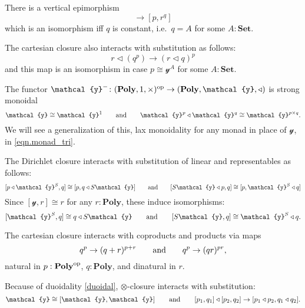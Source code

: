\documentclass[11pt, one side, article]{memoir}
\theoremstyle{definition}
\theoremstyle{plain}
\newcommand{\Cat}[1]{\mathbf{#1}}%
\newcommand{\op}{^\tn{op}}
\newcommand{\tn}[1]{\textnormal{#1}}
\newcommand{\smset}{\Cat{Set}}
\newcommand{\yon}{{\mathcal{y}}}
\newcommand{\poly}{\Cat{Poly}}
\newcommand{\0}{\textsf{0}}
\newcommand{\1}{\tn{\textsf{1}}}
\newcommand{\tri}{\mathbin{\triangleleft}}
\newcommand{\hh}[2][]{#1 \tn{#2} #1}
\newcommand{\qqand}{\hh[\qquad]{and}}
\begin{document}
There is a vertical epimorphism
\begin{equation}
	[p\times q,r]\to[p,r^q]
\end{equation}
which is an isomorphism iff $q$ is constant, i.e.\ $q=A$ for some $A:\smset$.

The cartesian closure also interacts with substitution as follows:
\begin{equation}
	r\tri (q^p)\to (r\tri q)^p
\end{equation}
and this map is an isomorphism in case $p\cong\yon^A$ for some $A:\smset$. 

The functor $\yon^-\colon(\poly,1,\times)\op\to(\poly,\yon,\tri)$ is strong monoidal
\begin{equation}
	\yon\cong\yon^1
	\qqand
	\yon^p\tri\yon^q\cong\yon^{p\times q}.
\end{equation}
We will see a generalization of this, lax monoidality for any monad in place of $\yon$, in \eqref{eqn.monad_tri}.

The Dirichlet closure interacts with substitution of linear and representables as follows:
\begin{equation}\label{eqn.innerhom_adj}
  [p\tri \yon^S,q]\cong[p,q\tri S\yon]
  \qqand
  [S\yon\tri p,q]\cong[p,\yon^S\tri q]
\end{equation}
Since $[\yon,r]\cong r$ for any $r:\poly$, these induce isomorphisms:
\begin{equation}\label{eqn.closure_lin_rep}
	[\yon^S,q]\cong q\tri S\yon
	\qqand
	[S\yon,q]\cong\yon^S\tri q.
\end{equation} 

The cartesian closure interacts with coproducts and products via maps
\begin{equation}
  q^p\to(q+r)^{p+r}
  \qqand
	q^p\to(qr)^{pr},
\end{equation}
natural in $p:\poly\op$, $q:\poly$, and dinatural in $r$.


Because of duoidality \eqref{duoidal}, $\otimes$-closure interacts with substitution:
\begin{equation}\label{eqn.shapiro_1}
	\yon\cong[\yon,\yon]
	\qqand
	[p_1,q_1]\tri[p_2,q_2]\to [p_1\tri p_2,q_1\tri q_2].
\end{equation}
\end{document}
